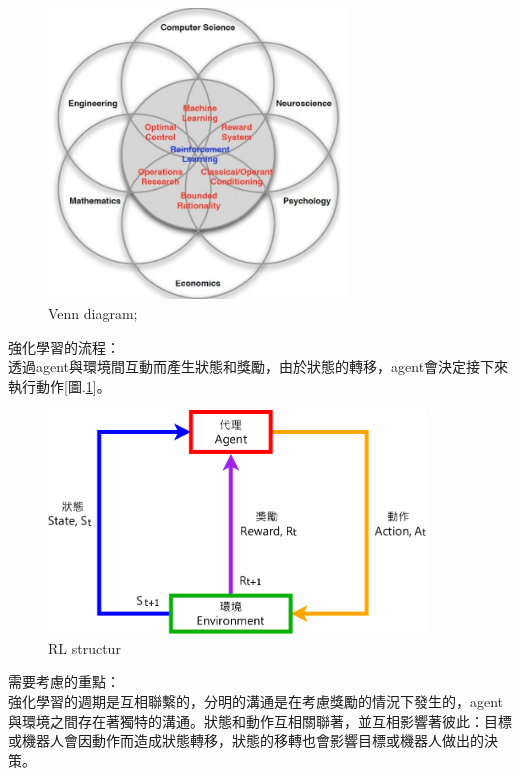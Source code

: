 \documentclass[14pt,a4paper]{report}  %
\begin{document}
\begin{figure}[hbt!]
\begin{center}
\includegraphics[width=8cm]{Faces_of_Reinforcement_Learning}
\caption{Venn diagram; }%
\end{center}
\end{figure}

強化學習的流程：\\
透過agent與環境間互動而產生狀態和獎勵，由於狀態的轉移，agent會決定接下來執行動作[圖.\ref{RL structur}]。\\[12pt]

\begin{figure}[hbt!]
\begin{center}
\includegraphics[width=10cm]{The_Flow_of_Reinforcement_Learning}
\caption{RL structur}
\label{RL structur}
\end{center}
\end{figure}

需要考慮的重點：\\
強化學習的週期是互相聯繫的，分明的溝通是在考慮獎勵的情況下發生的，agent與環境之間存在著獨特的溝通。狀態和動作互相關聯著，並互相影響著彼此：目標或機器人會因動作而造成狀態轉移，狀態的移轉也會影響目標或機器人做出的決策。\\
\end{document}
